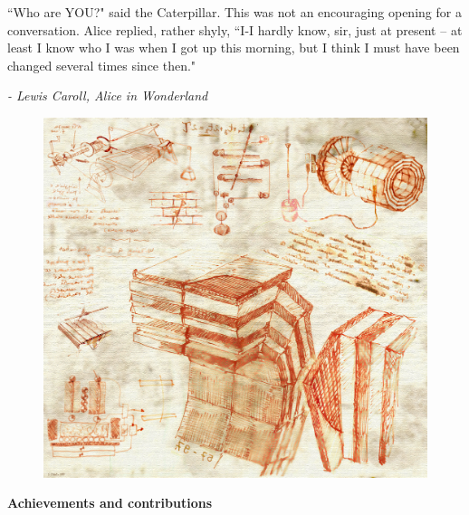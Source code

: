\cleardoublepage\thispagestyle{empty}

\begin{center}
	\epigraph{“Who are YOU?" said the Caterpillar.
		This was not an encouraging opening for a conversation. Alice replied, rather shyly, “I-I hardly know, sir, just at present – at least I know who I was when I got up this morning, but I think I must have been changed several times since then."}{\textit{- Lewis Caroll, Alice in Wonderland}}
	\vspace*{10mm}
     
	


\begin{figure}[th]
	\centering
	\includegraphics[width=0.85\linewidth]{./cover/oreach-2009-001_14}
\end{figure}
\vspace{10mm}
\huge \textbf{Achievements and contributions}
	\vspace{10mm}

\end{center}

\cleardoublepage
\setlength{\topmargin}{0mm}
\normalsize%